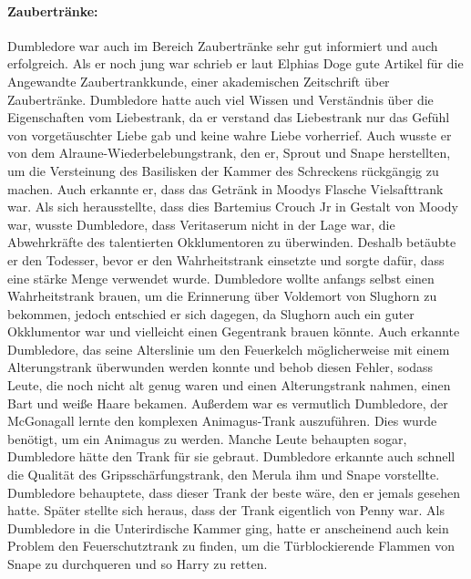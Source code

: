 \documentclass[a4paper, 10pt]{article}
\begin{document}
\paragraph{Zaubertränke:}
Dumbledore war auch im Bereich Zaubertränke sehr gut informiert und auch erfolgreich. Als er noch jung war schrieb er laut Elphias Doge gute Artikel für die Angewandte Zaubertrankkunde, einer akademischen Zeitschrift über Zaubertränke. Dumbledore hatte auch viel Wissen und Verständnis über die Eigenschaften vom Liebestrank, da er verstand das Liebestrank nur das Gefühl von vorgetäuschter Liebe gab und keine wahre Liebe vorherrief. Auch wusste er von dem Alraune-Wiederbelebungstrank, den er, Sprout und Snape herstellten, um die Versteinung des Basilisken der Kammer des Schreckens rückgängig zu machen. Auch erkannte er, dass das Getränk in Moodys Flasche Vielsafttrank war. Als sich herausstellte, dass dies Bartemius Crouch Jr in Gestalt von Moody war, wusste Dumbledore, dass Veritaserum nicht in der Lage war, die Abwehrkräfte des talentierten Okklumentoren zu überwinden. Deshalb betäubte er den Todesser, bevor er den Wahrheitstrank einsetzte und sorgte dafür, dass eine stärke Menge verwendet wurde. Dumbledore wollte anfangs selbst einen Wahrheitstrank brauen, um die Erinnerung über Voldemort von Slughorn zu bekommen, jedoch entschied er sich dagegen, da Slughorn auch ein guter Okklumentor war und vielleicht einen Gegentrank brauen könnte. Auch erkannte Dumbledore, das seine Alterslinie um den Feuerkelch möglicherweise mit einem Alterungstrank überwunden werden konnte und behob diesen Fehler, sodass Leute, die noch nicht alt genug waren und einen Alterungstrank nahmen, einen Bart und weiße Haare bekamen. Außerdem war es vermutlich Dumbledore, der McGonagall lernte den komplexen Animagus-Trank auszuführen. Dies wurde benötigt, um ein Animagus zu werden. Manche Leute behaupten sogar, Dumbledore hätte den Trank für sie gebraut. Dumbledore erkannte auch schnell die Qualität des Gripsschärfungstrank, den Merula ihm und Snape vorstellte. Dumbledore behauptete, dass dieser Trank der beste wäre, den er jemals gesehen hatte. Später stellte sich heraus, dass der Trank eigentlich von Penny war. Als Dumbledore in die Unterirdische Kammer ging, hatte er anscheinend auch kein Problem den Feuerschutztrank zu finden, um die Türblockierende Flammen von Snape zu durchqueren und so Harry zu retten.
\end{document}
